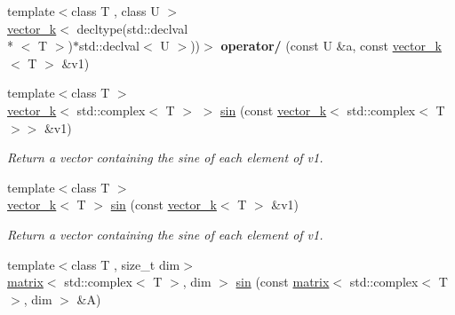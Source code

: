 \begin{DoxyCompactItemize}
\item 
\hypertarget{namespacekeycpp_aa5daf45d6627feee18402005fcd83cfd}{{\footnotesize template$<$class T , class U $>$ }\\\hyperlink{classkeycpp_1_1vector__k}{vector\-\_\-k}$<$ decltype(std\-::declval\\*
$<$ T $>$)$\ast$std\-::declval$<$ U $>$))$>$ {\bfseries operator/} (const U \&a, const \hyperlink{classkeycpp_1_1vector__k}{vector\-\_\-k}$<$ T $>$ \&v1)}\label{namespacekeycpp_aa5daf45d6627feee18402005fcd83cfd}

\item 
\hypertarget{namespacekeycpp_a3fad354ed572051e939cc71209c112ab}{{\footnotesize template$<$class T $>$ }\\\hyperlink{classkeycpp_1_1vector__k}{vector\-\_\-k}$<$ std\-::complex$<$ T $>$ $>$ \hyperlink{namespacekeycpp_a3fad354ed572051e939cc71209c112ab}{sin} (const \hyperlink{classkeycpp_1_1vector__k}{vector\-\_\-k}$<$ std\-::complex$<$ T $>$$>$ \&v1)}\label{namespacekeycpp_a3fad354ed572051e939cc71209c112ab}

\begin{DoxyCompactList}\small\item\em Return a vector containing the sine of each element of v1. \end{DoxyCompactList}\item 
\hypertarget{namespacekeycpp_aea600162295a122a2371d75f80f764c5}{{\footnotesize template$<$class T $>$ }\\\hyperlink{classkeycpp_1_1vector__k}{vector\-\_\-k}$<$ T $>$ \hyperlink{namespacekeycpp_aea600162295a122a2371d75f80f764c5}{sin} (const \hyperlink{classkeycpp_1_1vector__k}{vector\-\_\-k}$<$ T $>$ \&v1)}\label{namespacekeycpp_aea600162295a122a2371d75f80f764c5}

\begin{DoxyCompactList}\small\item\em Return a vector containing the sine of each element of v1. \end{DoxyCompactList}\item 
\hypertarget{namespacekeycpp_a18a3ebbda3c25527ae280f5c5725ff4e}{{\footnotesize template$<$class T , size\-\_\-t dim$>$ }\\\hyperlink{classkeycpp_1_1matrix}{matrix}$<$ std\-::complex$<$ T $>$, dim $>$ \hyperlink{namespacekeycpp_a18a3ebbda3c25527ae280f5c5725ff4e}{sin} (const \hyperlink{classkeycpp_1_1matrix}{matrix}$<$ std\-::complex$<$ T $>$, dim $>$ \&A)}\label{namespacekeycpp_a18a3ebbda3c25527ae280f5c5725ff4e}


\end{DoxyCompactItemize}

